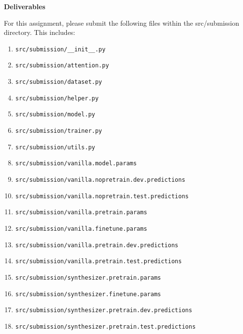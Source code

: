 


\textbf{Deliverables}

For this assignment, please submit the following files within the src/submission directory. This includes:

\begin{enumerate}
        \item \texttt{src/submission/\_\_init\_\_.py}
        \item \texttt{src/submission/attention.py}
        \item \texttt{src/submission/dataset.py}
        \item \texttt{src/submission/helper.py}
        \item \texttt{src/submission/model.py}
        \item \texttt{src/submission/trainer.py}
        \item \texttt{src/submission/utils.py}
        \item \texttt{src/submission/vanilla.model.params}
        \item \texttt{src/submission/vanilla.nopretrain.dev.predictions}
        \item \texttt{src/submission/vanilla.nopretrain.test.predictions}
        \item \texttt{src/submission/vanilla.pretrain.params}
        \item \texttt{src/submission/vanilla.finetune.params}
        \item \texttt{src/submission/vanilla.pretrain.dev.predictions}
        \item \texttt{src/submission/vanilla.pretrain.test.predictions}
        \item \texttt{src/submission/synthesizer.pretrain.params}
        \item \texttt{src/submission/synthesizer.finetune.params}
        \item \texttt{src/submission/synthesizer.pretrain.dev.predictions}
        \item \texttt{src/submission/synthesizer.pretrain.test.predictions}
\end{enumerate}

